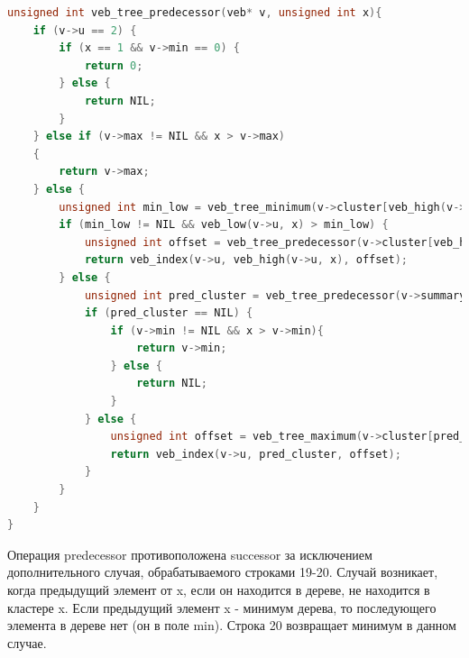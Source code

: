\documentclass{article}
\begin{document}
\begin{lstlisting}[language=C,style=C]
unsigned int veb_tree_predecessor(veb* v, unsigned int x){
    if (v->u == 2) {
        if (x == 1 && v->min == 0) {
            return 0;
        } else {
            return NIL;
        }
    } else if (v->max != NIL && x > v->max)
    {
        return v->max;
    } else {
        unsigned int min_low = veb_tree_minimum(v->cluster[veb_high(v->u, x)]);
        if (min_low != NIL && veb_low(v->u, x) > min_low) {
            unsigned int offset = veb_tree_predecessor(v->cluster[veb_high(v->u, x)], veb_low(v->u, x));
            return veb_index(v->u, veb_high(v->u, x), offset);
        } else {
            unsigned int pred_cluster = veb_tree_predecessor(v->summary, veb_high(v->u, x));
            if (pred_cluster == NIL) {
                if (v->min != NIL && x > v->min){
                    return v->min;
                } else {
                    return NIL;
                }
            } else {
                unsigned int offset = veb_tree_maximum(v->cluster[pred_cluster]);
                return veb_index(v->u, pred_cluster, offset);
            }
        }
    }
}
\end{lstlisting}
Операция predecessor противоположена successor за исключением дополнительного случая, обрабатываемого строками 19-20. Случай возникает, когда предыдущий элемент от x, если он находится в дереве, не находится в кластере x. Если предыдущий элемент x - минимум дерева, то последующего элемента в дереве нет (он в поле min). Строка 20 возвращает минимум в данном случае.
\end{document}
